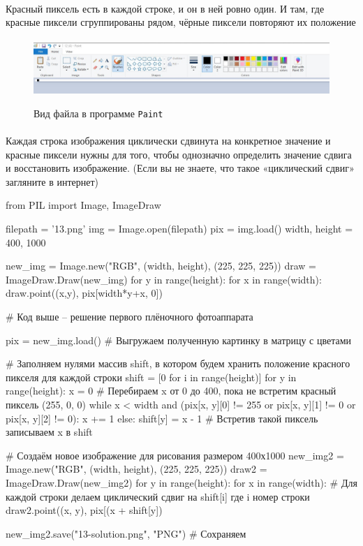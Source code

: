 \documentclass[12pt]{article}
\begin{document}
    \paragraph{}
    Красный пиксель есть в каждой строке, и он в ней ровно один.
    И там, где красные пиксели сгруппированы рядом, чёрные пиксели повторяют их положение
    \paragraph{}
    \begin{figure}[H]
        \centering
        \includegraphics[width=\linewidth]{task12}
        \label{fig:task12}
        \caption{Вид файла в программе \verb|Paint|}
    \end{figure}
    \paragraph{}
    Каждая строка изображения циклически сдвинута на конкретное значение и красные пиксели нужны для того,
    чтобы однозначно определить значение сдвига и восстановить изображение.
    (Если вы не знаете, что такое «циклический сдвиг» загляните в интернет)
    \begin{pythoncode}
from PIL import Image, ImageDraw

filepath = '13.png'
img = Image.open(filepath)
pix = img.load()
width, height = 400, 1000

new_img = Image.new("RGB", (width, height), (225, 225, 225))
draw = ImageDraw.Draw(new_img)
for y in range(height):
    for x in range(width):
        draw.point((x,y), pix[width*y+x, 0])

# Код выше -- решение первого плёночного фотоаппарата

pix = new_img.load()        # Выгружаем полученную картинку в матрицу с цветами

# Заполняем нулями массив shift, в котором будем хранить положение красного пикселя для каждой строки
shift = [0 for i in range(height)]
for y in range(height):
    x = 0                   # Перебираем x от 0 до 400, пока не встретим красный пиксель (255, 0, 0)
    while x < width and (pix[x, y][0] != 255 or pix[x, y][1] != 0 or pix[x, y][2] != 0):
        x += 1
    else:
        shift[y] = x - 1    # Встретив такой пиксель записываем x в shift

# Создаём новое изображение для рисования размером 400х1000
new_img2 = Image.new("RGB", (width, height), (225, 225, 225))
draw2 = ImageDraw.Draw(new_img2)
for y in range(height):
    for x in range(width):
        # Для каждой строки делаем циклический сдвиг на shift[i] где i номер строки
        draw2.point((x, y), pix[(x + shift[y]) %

new_img2.save("13-solution.png", "PNG")  # Сохраняем

    \end{pythoncode}
\end{document}
